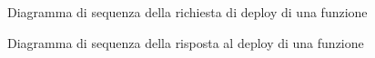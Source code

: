 \begin{figure}[H]
	\noindent
	\caption{Diagramma di sequenza della richiesta di deploy di una funzione}
\end{figure}
\begin{figure}[H]
	\noindent
	\caption{Diagramma di sequenza della risposta al deploy di una funzione}
\end{figure}

